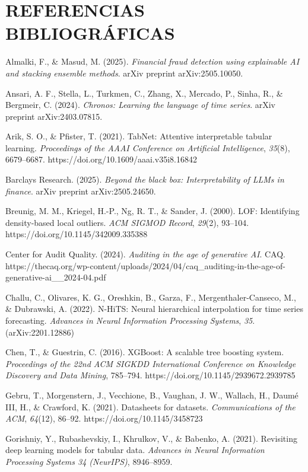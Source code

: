 \section{REFERENCIAS
BIBLIOGRÁFICAS}\label{referencias-bibliogruxe1ficas}

Almalki, F., \& Masud, M. (2025). \emph{Financial fraud detection using
explainable AI and stacking ensemble methods}. arXiv preprint
arXiv:2505.10050.

Ansari, A. F., Stella, L., Turkmen, C., Zhang, X., Mercado, P., Sinha,
R., \& Bergmeir, C. (2024). \emph{Chronos: Learning the language of time
series}. arXiv preprint arXiv:2403.07815.

Arik, S. O., \& Pfister, T. (2021). TabNet: Attentive interpretable
tabular learning. \emph{Proceedings of the AAAI Conference on Artificial
Intelligence}, \emph{35}(8), 6679--6687.
https://doi.org/10.1609/aaai.v35i8.16842

Barclays Research. (2025). \emph{Beyond the black box: Interpretability
of LLMs in finance}. arXiv preprint arXiv:2505.24650.

Breunig, M. M., Kriegel, H.-P., Ng, R. T., \& Sander, J. (2000). LOF:
Identifying density-based local outliers. \emph{ACM SIGMOD Record},
\emph{29}(2), 93--104. https://doi.org/10.1145/342009.335388

Center for Audit Quality. (2024). \emph{Auditing in the age of
generative AI}. CAQ.
https://thecaq.org/wp-content/uploads/2024/04/caq\_auditing-in-the-age-of-generative-ai\_\_2024-04.pdf

Challu, C., Olivares, K. G., Oreshkin, B., Garza, F.,
Mergenthaler-Canseco, M., \& Dubrawski, A. (2022). N-HiTS: Neural
hierarchical interpolation for time series forecasting. \emph{Advances
in Neural Information Processing Systems}, \emph{35}. (arXiv:2201.12886)

Chen, T., \& Guestrin, C. (2016). XGBoost: A scalable tree boosting
system. \emph{Proceedings of the 22nd ACM SIGKDD International
Conference on Knowledge Discovery and Data Mining}, 785--794.
https://doi.org/10.1145/2939672.2939785

Gebru, T., Morgenstern, J., Vecchione, B., Vaughan, J. W., Wallach, H.,
Daumé III, H., \& Crawford, K. (2021). Datasheets for datasets.
\emph{Communications of the ACM}, \emph{64}(12), 86--92.
https://doi.org/10.1145/3458723

Gorishniy, Y., Rubashevskiy, I., Khrulkov, V., \& Babenko, A. (2021).
Revisiting deep learning models for tabular data. \emph{Advances in
Neural Information Processing Systems 34 (NeurIPS)}, 8946--8959.


